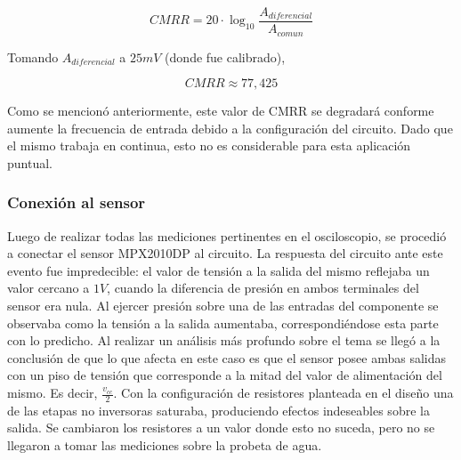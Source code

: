 \begin{equation}
CMRR = 20 \cdot \log_{10} \frac{A_{diferencial}}{A_{comun}}
\end{equation}

Tomando $A_{diferencial}$ a $25mV$ (donde fue calibrado),

\begin{equation}
CMRR \approx 77,425
\end{equation}

Como se mencion\'o anteriormente, este valor de CMRR se degradar\'a conforme aumente la frecuencia de entrada debido a la configuraci\'on del circuito. Dado que el mismo trabaja en continua, esto no es considerable para esta aplicaci\'on puntual.

\subsubsection*{Conexi\'on al sensor}

Luego de realizar todas las mediciones pertinentes en el osciloscopio, se procedi\'o a conectar el sensor \textsc{MPX2010DP} al circuito.
La respuesta del circuito ante este evento fue impredecible: el valor de tensi\'on a la salida del mismo reflejaba un valor cercano a $1V$, cuando la diferencia de presi\'on en ambos terminales del sensor era nula. Al ejercer presi\'on sobre una de las entradas del componente se observaba como la tensi\'on a la salida aumentaba, correspondi\'endose esta parte con lo predicho. Al realizar un an\'alisis m\'as profundo sobre el tema se lleg\'o a la conclusión de que lo que afecta en este caso es que el sensor posee ambas salidas con un piso de tensi\'on que corresponde a la mitad del valor de alimentaci\'on del mismo. Es decir, $\frac{v_{cc}}{2}$. Con la configuraci\'on de resistores planteada en el dise\~no una de las etapas no inversoras saturaba, produciendo efectos indeseables sobre la salida. Se cambiaron los resistores a un valor donde esto no suceda, pero no se llegaron a tomar las mediciones sobre la probeta de agua.


